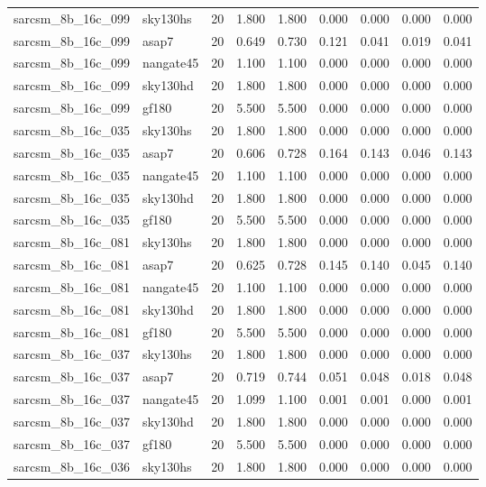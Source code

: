 \begin{tabular}{llrrrrrrr}
sarcsm\_8b\_16c\_099 & sky130hs & 20 & 1.800 & 1.800 & 0.000 & 0.000 & 0.000 & 0.000 \\
sarcsm\_8b\_16c\_099 & asap7 & 20 & 0.649 & 0.730 & 0.121 & 0.041 & 0.019 & 0.041 \\
sarcsm\_8b\_16c\_099 & nangate45 & 20 & 1.100 & 1.100 & 0.000 & 0.000 & 0.000 & 0.000 \\
sarcsm\_8b\_16c\_099 & sky130hd & 20 & 1.800 & 1.800 & 0.000 & 0.000 & 0.000 & 0.000 \\
sarcsm\_8b\_16c\_099 & gf180 & 20 & 5.500 & 5.500 & 0.000 & 0.000 & 0.000 & 0.000 \\
sarcsm\_8b\_16c\_035 & sky130hs & 20 & 1.800 & 1.800 & 0.000 & 0.000 & 0.000 & 0.000 \\
sarcsm\_8b\_16c\_035 & asap7 & 20 & 0.606 & 0.728 & 0.164 & 0.143 & 0.046 & 0.143 \\
sarcsm\_8b\_16c\_035 & nangate45 & 20 & 1.100 & 1.100 & 0.000 & 0.000 & 0.000 & 0.000 \\
sarcsm\_8b\_16c\_035 & sky130hd & 20 & 1.800 & 1.800 & 0.000 & 0.000 & 0.000 & 0.000 \\
sarcsm\_8b\_16c\_035 & gf180 & 20 & 5.500 & 5.500 & 0.000 & 0.000 & 0.000 & 0.000 \\
sarcsm\_8b\_16c\_081 & sky130hs & 20 & 1.800 & 1.800 & 0.000 & 0.000 & 0.000 & 0.000 \\
sarcsm\_8b\_16c\_081 & asap7 & 20 & 0.625 & 0.728 & 0.145 & 0.140 & 0.045 & 0.140 \\
sarcsm\_8b\_16c\_081 & nangate45 & 20 & 1.100 & 1.100 & 0.000 & 0.000 & 0.000 & 0.000 \\
sarcsm\_8b\_16c\_081 & sky130hd & 20 & 1.800 & 1.800 & 0.000 & 0.000 & 0.000 & 0.000 \\
sarcsm\_8b\_16c\_081 & gf180 & 20 & 5.500 & 5.500 & 0.000 & 0.000 & 0.000 & 0.000 \\
sarcsm\_8b\_16c\_037 & sky130hs & 20 & 1.800 & 1.800 & 0.000 & 0.000 & 0.000 & 0.000 \\
sarcsm\_8b\_16c\_037 & asap7 & 20 & 0.719 & 0.744 & 0.051 & 0.048 & 0.018 & 0.048 \\
sarcsm\_8b\_16c\_037 & nangate45 & 20 & 1.099 & 1.100 & 0.001 & 0.001 & 0.000 & 0.001 \\
sarcsm\_8b\_16c\_037 & sky130hd & 20 & 1.800 & 1.800 & 0.000 & 0.000 & 0.000 & 0.000 \\
sarcsm\_8b\_16c\_037 & gf180 & 20 & 5.500 & 5.500 & 0.000 & 0.000 & 0.000 & 0.000 \\
sarcsm\_8b\_16c\_036 & sky130hs & 20 & 1.800 & 1.800 & 0.000 & 0.000 & 0.000 & 0.000 \\

\end{tabular}
